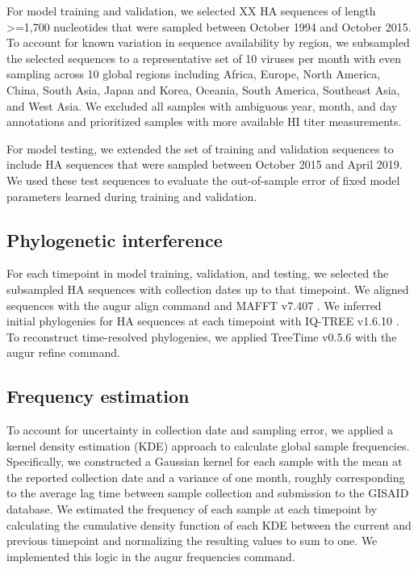 For model training and validation, we selected XX HA sequences of length >=1,700 nucleotides that were sampled between October 1994 and October 2015.
To account for known variation in sequence availability by region, we subsampled the selected sequences to a representative set of 10 viruses per month with even sampling across 10 global regions including Africa, Europe, North America, China, South Asia, Japan and Korea, Oceania, South America, Southeast Asia, and West Asia.
We excluded all samples with ambiguous year, month, and day annotations and prioritized samples with more available HI titer measurements.

For model testing, we extended the set of training and validation sequences to include HA sequences that were sampled between October 2015 and April 2019.
We used these test sequences to evaluate the out-of-sample error of fixed model parameters learned during training and validation.

\subsection*{Phylogenetic interference}

For each timepoint in model training, validation, and testing, we selected the subsampled HA sequences with collection dates up to that timepoint.
We aligned sequences with the augur align command \cite{Hadfield2018} and MAFFT v7.407 \cite{Katoh2002}.
We inferred initial phylogenies for HA sequences at each timepoint with IQ-TREE v1.6.10 \cite{Nguyen2014}.
To reconstruct time-resolved phylogenies, we applied TreeTime v0.5.6 \cite{Sagulenko2018} with the augur refine command.

\subsection*{Frequency estimation}

To account for uncertainty in collection date and sampling error, we applied a kernel density estimation (KDE) approach to calculate global sample frequencies.
Specifically, we constructed a Gaussian kernel for each sample with the mean at the reported collection date and a variance of one month, roughly corresponding to the average lag time between sample collection and submission to the GISAID database.
We estimated the frequency of each sample at each timepoint by calculating the cumulative density function of each KDE between the current and previous timepoint and normalizing the resulting values to sum to one.
We implemented this logic in the augur frequencies command.

